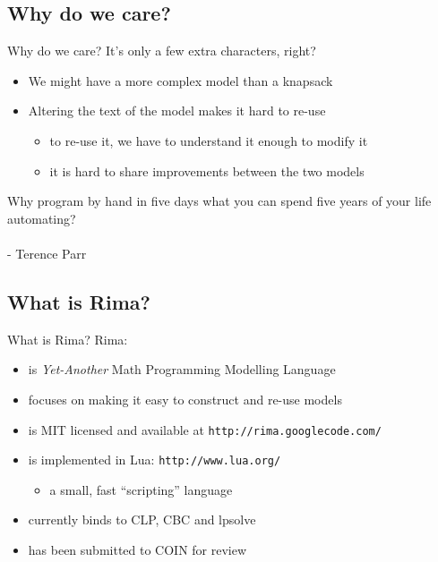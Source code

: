 \documentclass[smaller]{beamer}
\begin{document}
\subsection{Why do we care?}
\begin{frame}{Why do we care?}
  It's only a few extra characters, right?
  \pause
  \begin{itemize}
    \item We might have a more complex model than a knapsack
    \vspace{1ex}
    \item Altering the text of the model makes it hard to re-use
      \begin{itemize}
        \item to re-use it, we have to understand it enough to modify it
        \item it is hard to share improvements between the two models
      \end{itemize}
  \end{itemize}
\end{frame}


\begin{frame}
  Why program by hand in five days what you can spend five years of your life automating?\\
  ~\\
  - Terence Parr
\end{frame}


\subsection{What is Rima?}
\begin{frame}{What is Rima?}
  Rima:
  \begin{itemize}
    \item is \emph{Yet-Another} Math Programming Modelling Language
    \item focuses on making it easy to construct and re-use models
  \end{itemize}
  \begin{itemize}
    \item is MIT licensed and available at {\tt http://rima.googlecode.com/}
    \item is implemented in Lua: {\tt http://www.lua.org/}
    \begin{itemize}\item a small, fast ``scripting'' language\end{itemize}
    \item currently binds to CLP, CBC and lpsolve
    \item has been submitted to COIN for review
  \end{itemize}
\end{frame}
\end{document}
